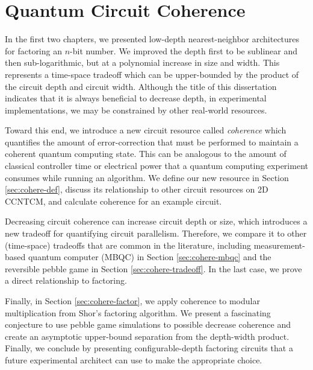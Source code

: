 \chapter{Quantum Circuit Coherence}
\label{chap:coherence}

In the first two chapters, we presented low-depth nearest-neighbor
architectures for factoring an $n$-bit number. We improved the depth first to
be sublinear and then sub-logarithmic, but at a polynomial increase in size
and width. This represents a time-space tradeoff which can be upper-bounded
by the product of the circuit depth and circuit width. Although the title of
this dissertation indicates that it is always beneficial to decrease depth, in
experimental implementations, we may be constrained by other real-world
resources.

Toward this end, we introduce a new circuit resource called \emph{coherence}
which quantifies the amount of error-correction that must be performed
to maintain a coherent quantum computing state. This can be analogous to
the amount of classical controller time or electrical power that a
quantum computing experiment consumes while running an algorithm. We
define our new resource in Section \ref{sec:cohere-def}, discuss its
relationship to other circuit resources on \textsf{2D CCNTCM}, and
calculate coherence for an example circuit.

Decreasing circuit coherence can increase circuit depth or size, which introduces
a new tradeoff for quantifying circuit parallelism.
Therefore, we compare it to other (time-space) tradeoffs that are common in
the literature, including measurement-based quantum computer (MBQC) in
Section \ref{sec:cohere-mbqc} and the reversible pebble game in
Section \ref{sec:cohere-tradeoff}. In the last case, we prove a
direct relationship to factoring.

Finally, in Section \ref{sec:cohere-factor}, we apply coherence to modular
multiplication from Shor's factoring algorithm.
We present a fascinating conjecture to use pebble game simulations to
possible decrease coherence and create an asymptotic upper-bound
separation from the depth-width product.
Finally, we conclude
by presenting configurable-depth factoring circuits
that a future experimental architect can use to make the appropriate choice.












%

%